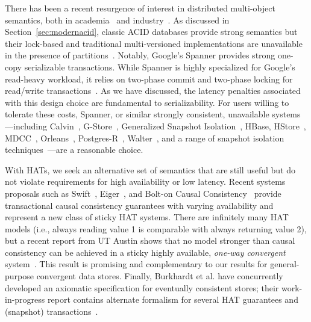 There has been a recent resurgence of interest in distributed
multi-object semantics, both in academia~\cite{kraska-s3, gstore,
  mdcc, eiger, walter,calvin, swift} and industry~\cite{orleans,
  spanner}. As discussed in Section~\ref{sec:modernacid}, classic ACID
databases provide strong semantics but their lock-based and
traditional multi-versioned implementations are unavailable in the
presence of partitions~\cite{bernstein-book, gray-isolation}. Notably,
Google's Spanner provides strong one-copy serializable
transactions. While Spanner is highly specialized for Google's
read-heavy workload, it relies on two-phase commit and two-phase
locking for read/write transactions~\cite{spanner}. As we have
discussed, the latency penalties associated with this design choice
are fundamental to serializability. For users willing to tolerate
these costs, Spanner, or similar strongly consistent, unavailable
systems---including Calvin~\cite{calvin}, G-Store~\cite{gstore},
Generalized Snapshot Isolation~\cite{generalizedsnapshot}, HBase,
HStore~\cite{hstore}, MDCC~\cite{mdcc}, Orleans~\cite{orleans},
Postgres-R~\cite{kemme-thesis}, Walter~\cite{walter}, and a range of
snapshot isolation techniques~\cite{middleware-db, kemme-snapshot,
  daudjee-snapshot}---are a reasonable choice.

With HATs, we seek an alternative set of semantics that are still
useful but do not violate requirements for high availability or low
latency. Recent systems proposals such as Swift~\cite{swift},
Eiger~\cite{eiger}, and Bolt-on Causal Consistency~\cite{bolton}
provide transactional causal consistency guarantees with varying
availability and represent a new class of sticky HAT systems. There
are infinitely many HAT models (i.e., always reading value 1 is
comparable with always returning value 2), but a recent report from UT
Austin shows that no model stronger than causal consistency can be
achieved in a sticky highly available, \textit{one-way convergent}
system~\cite{cac}. This result is promising and complementary to our
results for general-purpose convergent data stores. Finally, Burkhardt
et al. have concurrently developed an axiomatic specification for
eventually consistent stores; their work-in-progress report contains
alternate formalism for several HAT guarantees and (snapshot)
transactions~\cite{burkhardt-txns}.






